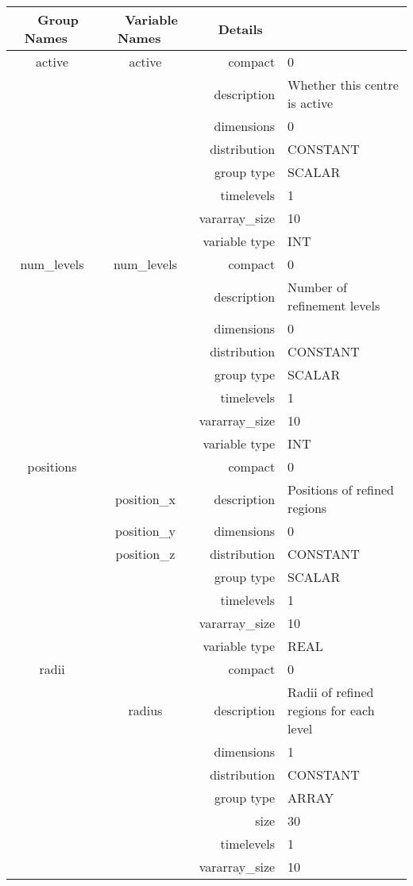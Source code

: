 \begin{tabular*}{150mm}{|c|c@{\extracolsep{\fill}}|rl|} \hline 
~ {\bf Group Names} ~ & ~ {\bf Variable Names} ~  &{\bf Details} ~ & ~\\ 
\hline 
active & active & compact & 0 \\ 
 &  & description & Whether this centre is active \\ 
 &  & dimensions & 0 \\ 
 &  & distribution & CONSTANT \\ 
 &  & group type & SCALAR \\ 
 &  & timelevels & 1 \\ 
 &  & vararray\_size & 10 \\ 
 &  & variable type & INT \\ 
\hline 
num\_levels & num\_levels & compact & 0 \\ 
 &  & description & Number of refinement levels \\ 
 &  & dimensions & 0 \\ 
 &  & distribution & CONSTANT \\ 
 &  & group type & SCALAR \\ 
 &  & timelevels & 1 \\ 
 &  & vararray\_size & 10 \\ 
 &  & variable type & INT \\ 
\hline 
positions &  & compact & 0 \\ 
 & position\_x & description & Positions of refined regions \\ 
 & position\_y & dimensions & 0 \\ 
 & position\_z & distribution & CONSTANT \\ 
 &  & group type & SCALAR \\ 
 &  & timelevels & 1 \\ 
 &  & vararray\_size & 10 \\ 
 &  & variable type & REAL \\ 
\hline 
radii &  & compact & 0 \\ 
 & radius & description & Radii of refined regions for each level \\ 
 &  & dimensions & 1 \\ 
 &  & distribution & CONSTANT \\ 
 &  & group type & ARRAY \\ 
 &  & size & 30 \\ 
 &  & timelevels & 1 \\ 
 &  & vararray\_size & 10 \\ 

\end{tabular*}
